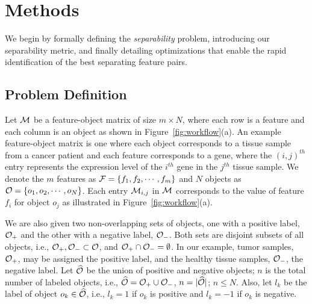 \section{Methods}
\label{sec:method}
We begin by formally defining the {\em separability} problem,
introducing our separability metric,
and finally detailing optimizations that enable
the rapid identification of the best separating feature pairs.

\subsection{Problem Definition}\label{sec:prob}

Let ${\mathcal{M}}$ be a feature-object matrix of size $m\times N$,
where each row is a feature and each column is an
object as shown in Figure~\ref{fig:workflow}(a).
An example feature-object matrix is one where
each object corresponds to a tissue sample
from a cancer patient and each feature corresponds to a gene,
where the $(i,j)^{th}$ entry represents the
expression level of the $i^{th}$ gene in the $j^{th}$
tissue sample.
We denote the $m$ features as ${\mathcal{F}}=\{f_1,f_2,\cdots,f_m\}$
and $N$ objects as ${\mathcal{O}}=\{o_1,o_2,\cdots,o_N\}$.
Each entry ${\mathcal{M}}_{i,j}$ in ${\mathcal{M}}$ corresponds
to the value of feature $f_i$ for object $o_j$ as illustrated in Figure~\ref{fig:workflow}(a).

We are also given two non-overlapping sets of objects,
one with a positive label, ${\mathcal{O}}_+$ and the other with a negative label, ${\mathcal{O}}_-$.
Both sets are disjoint subsets of all objects,
i.e., ${\mathcal{O}}_+, {\mathcal{O}}_-\subset {\mathcal{O}}$, and ${\mathcal{O}}_+\cap {\mathcal{O}}_- = \emptyset$.
In our example, tumor samples, ${\mathcal{O}}_+$,
may be assigned the positive label,
and the healthy tissue samples, ${\mathcal{O}}_-$,
the negative label.
Let $\widehat{{\mathcal{O}}}$ be the union of positive and negative objects; $n$ is the total number of labeled objects, i.e., $\widehat{{\mathcal{O}}}={\mathcal{O}}_+\cup {\mathcal{O}}_-$, $n=|\widehat{{\mathcal{O}}}|$; $n\leq N$. Also, let $l_k$ be the label of object $o_k\in \widehat{{\mathcal{O}}}$, i.e., $l_k=1$ if $o_k$ is positive and $l_k=-1$ if $o_k$ is negative.

